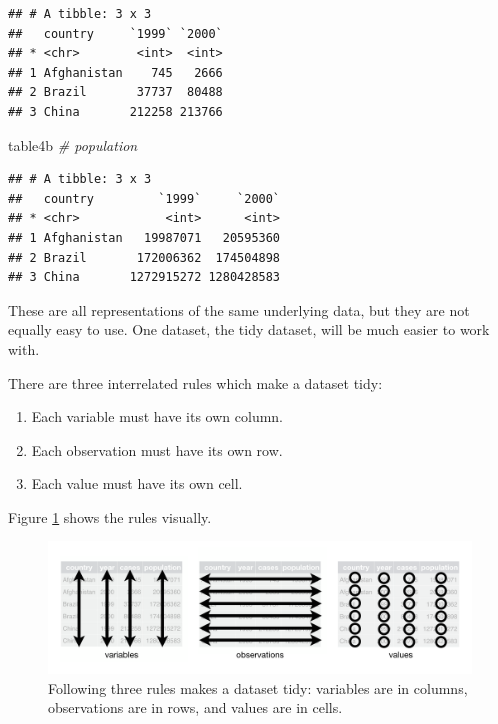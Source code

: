 \documentclass[
]{book}
\newenvironment{Shaded}{\begin{snugshade}}{\end{snugshade}}
\newcommand{\CommentTok}[1]{\textcolor[rgb]{0.56,0.35,0.01}{\textit{#1}}}
\newcommand{\NormalTok}[1]{#1}
\providecommand{\tightlist}{%
  \setlength{\itemsep}{0pt}\setlength{\parskip}{0pt}}
\begin{document}
\begin{verbatim}
## # A tibble: 3 x 3
##   country     `1999` `2000`
## * <chr>        <int>  <int>
## 1 Afghanistan    745   2666
## 2 Brazil       37737  80488
## 3 China       212258 213766
\end{verbatim}

\begin{Shaded}
\begin{Highlighting}[]
\NormalTok{table4b  }\CommentTok{# population}
\end{Highlighting}
\end{Shaded}

\begin{verbatim}
## # A tibble: 3 x 3
##   country         `1999`     `2000`
## * <chr>            <int>      <int>
## 1 Afghanistan   19987071   20595360
## 2 Brazil       172006362  174504898
## 3 China       1272915272 1280428583
\end{verbatim}

These are all representations of the same underlying data, but they are not equally easy to use. One dataset, the tidy dataset, will be much easier to work with.

There are three interrelated rules which make a dataset tidy:

\begin{enumerate}
\def\labelenumi{\arabic{enumi}.}
\tightlist
\item
  Each variable must have its own column.
\item
  Each observation must have its own row.
\item
  Each value must have its own cell.
\end{enumerate}

Figure \ref{fig:tidy-structure} shows the rules visually.

\begin{figure}
\includegraphics[width=1\linewidth]{images/tidy-1} \caption{Following three rules makes a dataset tidy: variables are in columns, observations are in rows, and values are in cells.}\label{fig:tidy-structure}
\end{figure}
\end{document}
